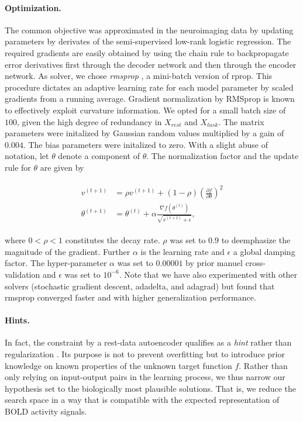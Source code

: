 \documentclass{article} %
\begin{document}
\paragraph{Optimization.}
The common objective was approximated in the neuroimaging data
by updating parameters by derivates of the 
semi-supervised low-rank logistic regression.
The required gradients are easily obtained by using the chain rule to
backpropagate error derivatives first through the decoder network
and then through the encoder network.
As solver, we chose \textit{rmsprop} \cite{rmsprop},
a mini-batch version of rprop.
This procedure dictates an adaptive learning rate
for each model parameter by
scaled gradients from a running average.
Gradient normalization by RMSprop
is known to effectively exploit curvature information.
We opted for a small batch size of $100$, given the high degree of
redundancy in $X_{rest}$ and $X_{task}$.
The matrix parameters were initalized by Gaussian random values multiplied
by a gain of $0.004$. The bias parameters were initalized to zero.
With a slight abuse of notation, let $\theta$ denote a component of $\theta$.
The normalization factor and the update rule for $\theta$
are given by

\begin{eqnarray}
  \begin{split}
v^{(t+1)} &= \rho v^{(t+1)} + (1 - \rho)\left(\frac{\partial f}{\partial \theta}\right)^2
\\
\theta^{(t+1)} &= \theta^{(t)} + \alpha \frac{\nabla f(\theta^{(t)})}{\sqrt{v^{(t+1)} + \epsilon}},
  \end{split}
\end{eqnarray}

where $0 < \rho < 1$ constitutes the decay rate. $\rho$ was set to
$0.9$ to deemphasize the magnitude of the gradient.
Further $\alpha$ is the learning rate and $\epsilon$ a global damping factor.
The hyper-parameter $\alpha$ was set to $0.00001$ by prior manuel
cross-validation and $\epsilon$ was set to $10^{-6}$.
%
Note that we have also experimented with other solvers
(stochastic gradient descent, adadelta, and adagrad) but found that
rmsprop converged faster and with higher generalization performance.

\paragraph{Hints.}
In fact, the constraint by a rest-data autoencoder qualifies as a
\textit{hint} rather than regularization \cite{abu1994hints}.
Its purpose is not to prevent overfitting but to introduce
prior knowledge on known properties of the unknown target function $f$.
Rather than only relying on input-output pairs in the learning process,
we thus narrow our hypothesis set to the biologically most plausible solutions.
That is, we reduce the search space in a way that
is compatible with the expected representation of BOLD activity signals.
\end{document}

